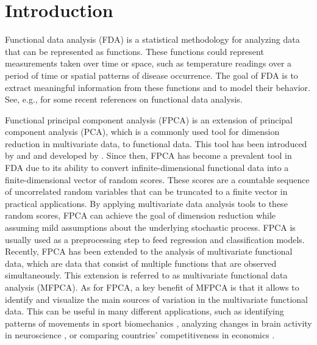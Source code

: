 \section{Introduction} %
\label{sec:introduction}

Functional data analysis (FDA) is a statistical methodology for analyzing data that can be represented as functions. These functions could represent measurements taken over time or space, such as temperature readings over a period of time or spatial patterns of disease occurrence. The goal of FDA is to extract meaningful information from these functions and to model their behavior. See, e.g., \cite{ramsayFunctionalDataAnalysis2005,horvathInferenceFunctionalData2012,wangFunctionalDataAnalysis2016,kokoszkaSpecialIssueFunctional2017} for some recent references on functional data analysis.

Functional principal component analysis (FPCA) is an extension of principal component analysis (PCA), which is a commonly used tool for dimension reduction in multivariate data, to functional data. This tool has been introduced by \cite{karhunenUeberLineareMethoden1947} and \cite{loeveFonctionsAleatoiresStationnaires1945} and developed by \cite{dauxoisAsymptoticTheoryPrincipal1982}. Since then, FPCA has become a prevalent tool in FDA due to its ability to convert infinite-dimensional functional data into a finite-dimensional vector of random scores. These scores are a countable sequence of uncorrelated random variables that can be truncated to a finite vector in practical applications. By applying multivariate data analysis tools to these random scores, FPCA can achieve the goal of dimension reduction while assuming mild assumptions about the underlying stochastic process. FPCA is usually used as a preprocessing step to feed regression and classification models. Recently, FPCA has been extended to the analysis of multivariate functional data, which are data that consist of multiple functions that are observed simultaneously. This extension is referred to as multivariate functional data analysis (MFPCA). As for FPCA, a key benefit of MFPCA is that it allows to identify and visualize the main sources of variation in the multivariate functional data. This can be useful in many different applications, such as identifying patterns of movements in sport biomechanics \citep{warmenhovenBivariateFunctionalPrincipal2019}, analyzing changes in brain activity in neuroscience \citep{songSparseMultivariateFunctional2022}, or comparing  countries' competitiveness in economics \citep{krzyskoMultidimensionalEconomicIndicators2022}.

